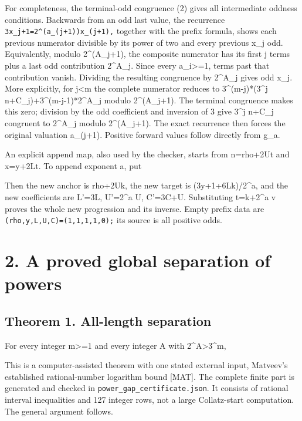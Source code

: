 For completeness, the terminal-odd congruence (2) gives all intermediate
oddness conditions. Backwards from an odd last value, the recurrence
\nolinkurl{3x_j+1=2^(a_(j+1))x_(j+1),} together with the prefix formula,
shows each previous numerator divisible by its power of two and every
previous x\_j odd. Equivalently, modulo 2\^{}(A\_j+1), the composite
numerator has its first j terms plus a last odd contribution 2\^{}A\_j.
Since every a\_i\textgreater=1, terms past that contribution vanish.
Dividing the resulting congruence by 2\^{}A\_j gives odd x\_j. More
explicitly, for j\textless m the complete numerator reduces to
3\^{}(m-j)*(3\^{}j n+C\_j)+3\^{}(m-j-1)*2\^{}A\_j modulo 2\^{}(A\_j+1).
The terminal congruence makes this zero; division by the odd coefficient
and inversion of 3 give 3\^{}j n+C\_j congruent to 2\^{}A\_j modulo
2\^{}(A\_j+1). The exact recurrence then forces the original valuation
a\_(j+1). Positive forward values follow directly from g\_a.

An explicit append map, also used by the checker, starts from n=rho+2Ut
and x=y+2Lt. To append exponent a, put


Then the new anchor is rho+2Uk, the new target is (3y+1+6Lk)/2\^{}a, and
the new coefficients are L'=3L, U'=2\^{}a U, C'=3C+U. Substituting
t=k+2\^{}a v proves the whole new progression and its inverse. Empty
prefix data are \nolinkurl{(rho,y,L,U,C)=(1,1,1,1,0);} its source is all
positive odds.

\section{2. A proved global separation of powers}

\subsection{Theorem 1. All-length separation}

For every integer m\textgreater=1 and every integer A with
2\^{}A\textgreater3\^{}m,


This is a computer-assisted theorem with one stated external input,
Matveev's established rational-number logarithm bound {[}MAT{]}. The
complete finite part is generated and checked in
\nolinkurl{power_gap_certificate.json}. It consists of rational interval
inequalities and 127 integer rows, not a large Collatz-start
computation. The general argument follows.

